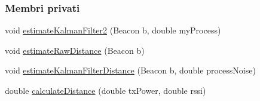 \subsubsection*{Membri privati}
\begin{DoxyCompactItemize}
\item 
void \hyperlink{classit_1_1unibo_1_1torsello_1_1bluetoothpositioning_1_1distanceEstimation_1_1Estimation_aae2873bb4c4a99faba630468d6ef20e0_aae2873bb4c4a99faba630468d6ef20e0}{estimate\+Kalman\+Filter2} (Beacon b, double my\+Process)
\item 
void \hyperlink{classit_1_1unibo_1_1torsello_1_1bluetoothpositioning_1_1distanceEstimation_1_1Estimation_a0cc72ed8871490402b1fac0a10520f7d_a0cc72ed8871490402b1fac0a10520f7d}{estimate\+Raw\+Distance} (Beacon b)
\item 
void \hyperlink{classit_1_1unibo_1_1torsello_1_1bluetoothpositioning_1_1distanceEstimation_1_1Estimation_ac3451825d5672d5e761269afc563e88e_ac3451825d5672d5e761269afc563e88e}{estimate\+Kalman\+Filter\+Distance} (Beacon b, double process\+Noise)
\item 
double \hyperlink{classit_1_1unibo_1_1torsello_1_1bluetoothpositioning_1_1distanceEstimation_1_1Estimation_a6e33d4e0b776517a86c6aa87cd51b66b_a6e33d4e0b776517a86c6aa87cd51b66b}{calculate\+Distance} (double tx\+Power, double rssi)
\end{DoxyCompactItemize}
